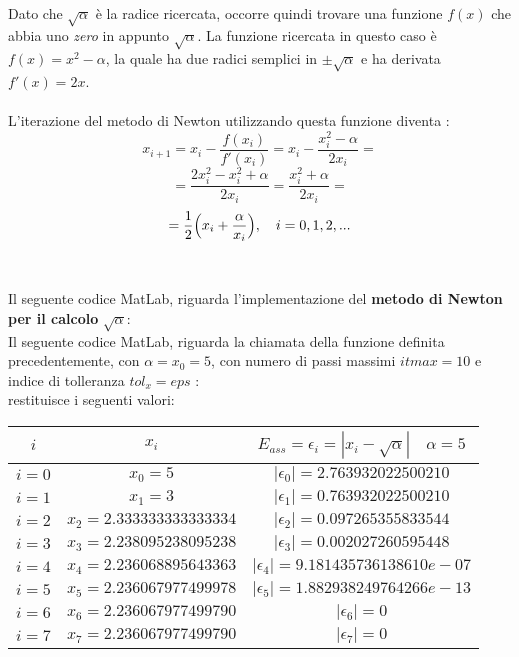 \large\noindent{}\\

Dato che  $\sqrt{\alpha}$ è la radice ricercata, occorre quindi trovare una
funzione $f(x)$ che abbia uno \textit{zero} in appunto $\sqrt{\alpha}$.
La funzione ricercata in questo caso è $f(x) = x^2 - \alpha$, la quale ha due radici
semplici in $\pm\sqrt{\alpha}$ e ha derivata $f'(x) = 2x$.\\\\
L'iterazione del metodo di Newton utilizzando questa funzione diventa :
	\[
	x_{i+1} = x_i-\frac{f(x_i)}{f'(x_i)} = x_i - \frac{x_i^2-\alpha}{2x_i} =
	\]
	\[
	= \frac{2x_i^2-x_i^2+\alpha}{2x_i} = \frac{x_i^2+\alpha}{2x_i} =
	\]
	\[
	= \frac{1}{2} \Bigl( x_i+\frac{\alpha}{x_i} \Bigl),\quad i=0,1,2,...
	\]\\\\
Il seguente codice MatLab, riguarda l'implementazione del \textbf{metodo di Newton per il calcolo} $\sqrt{\alpha}$:\\ 
	
Il seguente codice MatLab, riguarda la chiamata della funzione definita precedentemente, con $\alpha=x_0=5$, con numero di passi massimi $itmax=10$ e indice di tolleranza $tol_x=eps$ :\\
	
restituisce i seguenti valori:\\
\begin{center}
	\begin{tabular}{|c|c|c|}
		\hline
			$i$ & $x_i$ & $E_{ass}=\epsilon_i=|x_i-\sqrt{\alpha}| \quad \alpha=5$ \\
		\hline
    		$i=0$ & $x_0 = 5$ & $|\epsilon_0| = 2.763932022500210$\\
    		$i=1$ & $x_1 = 3$ & $|\epsilon_1| = 0.763932022500210$\\
    		$i=2$ & $x_2 = 2.333333333333334$ & $|\epsilon_2| = 0.097265355833544$\\
    		$i=3$ & $x_3 = 2.238095238095238$ & $|\epsilon_3| = 0.002027260595448$\\
    		$i=4$ & $x_4 = 2.236068895643363$ & $|\epsilon_4| = 9.181435736138610e-07$\\
    		$i=5$ & $x_5 = 2.236067977499978$ & $|\epsilon_5| = 1.882938249764266e-13$\\
    		$i=6$ & $x_6 = 2.236067977499790$ & $|\epsilon_6| = 0$\\
    		$i=7$ & $x_7 = 2.236067977499790$ & $|\epsilon_7| = 0$\\
		\hline
	\end{tabular}
\end{center}